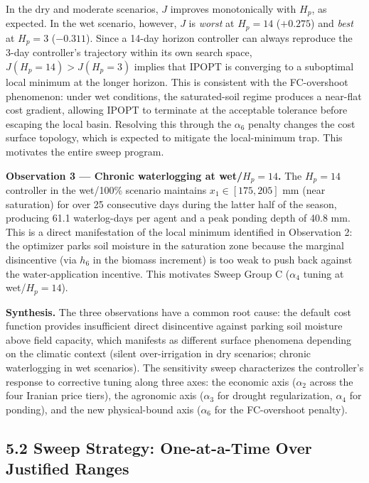 In the dry and moderate scenarios, \(J\) improves monotonically with
\(H_p\), as expected. In the wet scenario, however, \(J\) is
\emph{worst} at \(H_p = 14\) (\(+0.275\)) and \emph{best} at \(H_p = 3\)
(\(-0.311\)). Since a 14-day horizon controller can always reproduce the
3-day controller's trajectory within its own search space,
\(J(H_p=14) > J(H_p=3)\) implies that IPOPT is converging to a
suboptimal local minimum at the longer horizon. This is consistent with
the FC-overshoot phenomenon: under wet conditions, the saturated-soil
regime produces a near-flat cost gradient, allowing IPOPT to terminate
at the acceptable tolerance before escaping the local basin. Resolving
this through the \(\alpha_6\) penalty changes the cost surface topology,
which is expected to mitigate the local-minimum trap. This motivates the
entire sweep program.

\textbf{Observation 3 --- Chronic waterlogging at wet/\(H_p=14\).} The
\(H_p = 14\) controller in the wet/100\% scenario maintains
\(x_1 \in [175, 205]\) mm (near saturation) for over 25 consecutive days
during the latter half of the season, producing 61.1 waterlog-days per
agent and a peak ponding depth of 40.8 mm. This is a direct
manifestation of the local minimum identified in Observation 2: the
optimizer parks soil moisture in the saturation zone because the
marginal disincentive (via \(h_6\) in the biomass increment) is too weak
to push back against the water-application incentive. This motivates
Sweep Group C (\(\alpha_4\) tuning at wet/\(H_p=14\)).

\textbf{Synthesis.} The three observations have a common root cause: the
default cost function provides insufficient direct disincentive against
parking soil moisture above field capacity, which manifests as different
surface phenomena depending on the climatic context (silent
over-irrigation in dry scenarios; chronic waterlogging in wet
scenarios). The sensitivity sweep characterizes the controller's
response to corrective tuning along three axes: the economic axis
(\(\alpha_2\) across the four Iranian price tiers), the agronomic axis
(\(\alpha_3\) for drought regularization, \(\alpha_4\) for ponding), and
the new physical-bound axis (\(\alpha_6\) for the FC-overshoot penalty).

\subsection{5.2 Sweep Strategy: One-at-a-Time Over Justified
Ranges}\label{sweep-strategy-one-at-a-time-over-justified-ranges}

